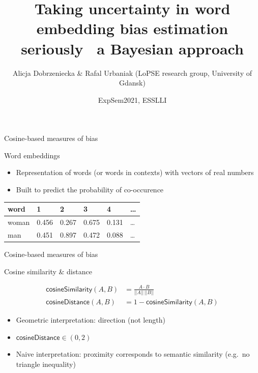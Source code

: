 \documentclass[10pt,ignorenonframetext,x11names, dvipsnames, bibspacing,natbib]{beamer}
\title{\large Taking uncertainty in word embedding bias estimation seriously ~a
Bayesian approach}
\author{Alicja Dobrzeniecka \& Rafal Urbaniak \footnotesize \newline (LoPSE
research group, University of Gdansk)}
\date{ExpSem2021, ESSLLI}
\begin{document}
\frame{\titlepage}

\begin{frame}{Cosine-based measures of bias}

\begin{block}{Word embeddings}

\begin{itemize}
\item
  Representation of words (or words in contexts) with vectors of real
  numbers
\item
  Built to predict the probability of co-occurence
\end{itemize}

\begin{longtable}[]{@{}llllll@{}}
\toprule
word & 1 & 2 & 3 & 4 & \ldots{}\tabularnewline
\midrule
\endhead
woman & 0.456 & 0.267 & 0.675 & 0.131 & \ldots{}\tabularnewline
man & 0.451 & 0.897 & 0.472 & 0.088 & \ldots{}\tabularnewline
\bottomrule
\end{longtable}

\end{block}

\end{frame}

\begin{frame}{Cosine-based measures of bias}

\begin{block}{Cosine similarity \& distance}

\vspace{-4mm}

\begin{align} \tag{Sim}
\mathsf{cosineSimilarity}(A,B) & = \frac{A \cdot B}{\vert \vert A \vert \vert \,\vert \vert B \vert \vert}
\\
\tag{Distance}
\mathsf{cosineDistance}(A,B) &  = 1 - \mathsf{cosineSimilarity}(A,B)
\end{align}

\begin{itemize}
\item
  Geometric interpretation: direction (not length)
\item
  \(\mathsf{cosineDistance}\in (0, 2)\)
\item
  Naive interpretation: proximity corresponds to semantic similarity
  (e.g.~no triangle inequality)
\end{itemize}

\end{block}

\end{frame}
\end{document}
